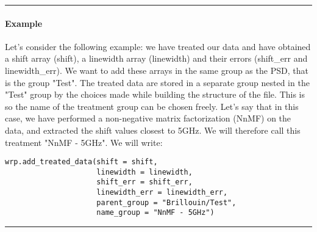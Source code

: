 \begin{center}
    \rule{15cm}{0.4pt}
\end{center}

\paragraph*{Example}
Let's consider the following example: we have treated our data and have obtained a shift array (shift), a linewidth array (linewidth) and their errors (shift\_err and linewidth\_err). We want to add these arrays in the same group as the PSD, that is the group "Test". The treated data are stored in a separate group nested in the "Test" group by the choices made while building the structure of the file. This is so the name of the treatment group can be chosen freely. Let's say that in this case, we have performed a non-negative matrix factorization (NnMF) on the data, and extracted the shift values closest to 5GHz. We will therefore call this treatment "NnMF - 5GHz". We will write:
\begin{lstlisting}
wrp.add_treated_data(shift = shift,
                     linewidth = linewidth,
                     shift_err = shift_err,
                     linewidth_err = linewidth_err,
                     parent_group = "Brillouin/Test", 
                     name_group = "NnMF - 5GHz")
\end{lstlisting}

\begin{center}
    \rule{15cm}{0.4pt}
\end{center}

